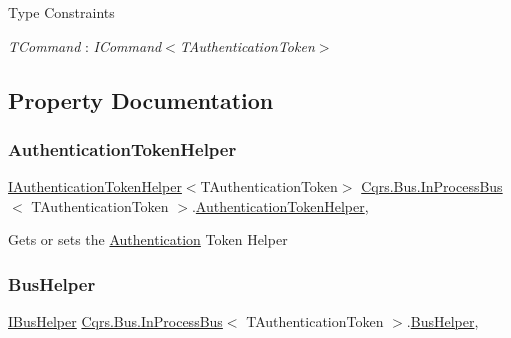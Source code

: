 \begin{Desc}
\item[Type Constraints]\begin{description}
\item[{\em T\+Command} : {\em I\+Command$<$T\+Authentication\+Token$>$}]\end{description}
\end{Desc}


\subsection{Property Documentation}
\mbox{\label{classCqrs_1_1Bus_1_1InProcessBus_a20d068b944183ab04e77c3164d19a860_a20d068b944183ab04e77c3164d19a860}} 
\subsubsection{\texorpdfstring{Authentication\+Token\+Helper}{AuthenticationTokenHelper}}
{\footnotesize\ttfamily \hyperlink{interfaceCqrs_1_1Authentication_1_1IAuthenticationTokenHelper}{I\+Authentication\+Token\+Helper}$<$T\+Authentication\+Token$>$ \hyperlink{classCqrs_1_1Bus_1_1InProcessBus}{Cqrs.\+Bus.\+In\+Process\+Bus}$<$ T\+Authentication\+Token $>$.\hyperlink{classCqrs_1_1Authentication_1_1AuthenticationTokenHelper}{Authentication\+Token\+Helper}\hspace{0.3cm}{\ttfamily [get]}, {\ttfamily [protected]}}



Gets or sets the \hyperlink{namespaceCqrs_1_1Authentication}{Authentication} Token Helper 

\mbox{\label{classCqrs_1_1Bus_1_1InProcessBus_a5dd1cb40277f3e04e743dd8cd63523ff_a5dd1cb40277f3e04e743dd8cd63523ff}} 
\subsubsection{\texorpdfstring{Bus\+Helper}{BusHelper}}
{\footnotesize\ttfamily \hyperlink{interfaceCqrs_1_1Bus_1_1IBusHelper}{I\+Bus\+Helper} \hyperlink{classCqrs_1_1Bus_1_1InProcessBus}{Cqrs.\+Bus.\+In\+Process\+Bus}$<$ T\+Authentication\+Token $>$.\hyperlink{classCqrs_1_1Bus_1_1BusHelper}{Bus\+Helper}\hspace{0.3cm}{\ttfamily [get]}, {\ttfamily [protected]}}



